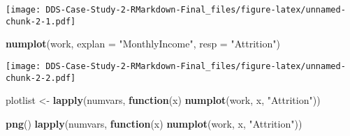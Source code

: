 \documentclass[]{article}
\newenvironment{Shaded}{\begin{snugshade}}{\end{snugshade}}
\newcommand{\CommentTok}[1]{\textcolor[rgb]{0.56,0.35,0.01}{\textit{#1}}}
\newcommand{\ControlFlowTok}[1]{\textcolor[rgb]{0.13,0.29,0.53}{\textbf{#1}}}
\newcommand{\DataTypeTok}[1]{\textcolor[rgb]{0.13,0.29,0.53}{#1}}
\newcommand{\FloatTok}[1]{\textcolor[rgb]{0.00,0.00,0.81}{#1}}
\newcommand{\KeywordTok}[1]{\textcolor[rgb]{0.13,0.29,0.53}{\textbf{#1}}}
\newcommand{\NormalTok}[1]{#1}
\newcommand{\OperatorTok}[1]{\textcolor[rgb]{0.81,0.36,0.00}{\textbf{#1}}}
\newcommand{\StringTok}[1]{\textcolor[rgb]{0.31,0.60,0.02}{#1}}
\begin{document}
\begin{Shaded}
\end{Shaded}

\texttt{[image: DDS-Case-Study-2-RMarkdown-Final\_files/figure-latex/unnamed-chunk-2-1.pdf]}

\begin{Shaded}
\begin{Highlighting}[]
\KeywordTok{numplot}\NormalTok{(work, }\DataTypeTok{explan =} \StringTok{"MonthlyIncome"}\NormalTok{, }\DataTypeTok{resp =} \StringTok{"Attrition"}\NormalTok{)}
\end{Highlighting}
\end{Shaded}

\texttt{[image: DDS-Case-Study-2-RMarkdown-Final\_files/figure-latex/unnamed-chunk-2-2.pdf]}

\begin{Shaded}
\begin{Highlighting}[]
\NormalTok{plotlist <-}\StringTok{ }\KeywordTok{lapply}\NormalTok{(numvars, }\ControlFlowTok{function}\NormalTok{(x) }\KeywordTok{numplot}\NormalTok{(work, x, }\StringTok{"Attrition"}\NormalTok{))}


\KeywordTok{png}\NormalTok{()}
\KeywordTok{lapply}\NormalTok{(numvars, }\ControlFlowTok{function}\NormalTok{(x) }\KeywordTok{numplot}\NormalTok{(work, x, }\StringTok{"Attrition"}\NormalTok{))}
\end{Highlighting}
\end{Shaded}
\end{document}

